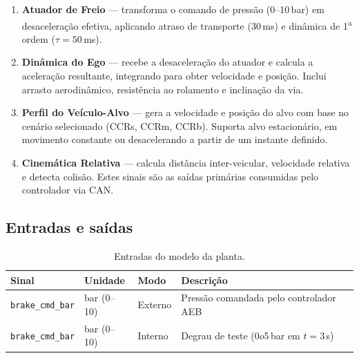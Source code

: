 \documentclass[12pt,a4paper]{article}
\newcommand{\param}[1]{\texttt{\color{laranjacode}#1}}
\begin{document}
\begin{enumerate}
  \item \textbf{Atuador de Freio} --- transforma o comando de pressão (0--10\,bar) em
        desaceleração efetiva, aplicando atraso de transporte (30\,ms) e dinâmica de
        1\textsuperscript{a} ordem ($\tau = 50$\,ms).

  \item \textbf{Dinâmica do Ego} --- recebe a desaceleração do atuador e calcula a
        aceleração resultante, integrando para obter velocidade e posição. Inclui
        arrasto aerodinâmico, resistência ao rolamento e inclinação da via.

  \item \textbf{Perfil do Veículo-Alvo} --- gera a velocidade e posição do alvo com base
        no cenário selecionado (CCRs, CCRm, CCRb). Suporta alvo estacionário, em
        movimento constante ou desacelerando a partir de um instante definido.

  \item \textbf{Cinemática Relativa} --- calcula distância inter-veicular, velocidade
        relativa e detecta colisão. Estes sinais são as saídas primárias consumidas
        pelo controlador via CAN.
\end{enumerate}

\subsection{Entradas e saídas}

\begin{table}[H]
  \centering
  \caption{Entradas do modelo da planta.}
  \begin{tabularx}{\linewidth}{lllX}
    \toprule
    \rowcolor{azulescuro!90}
    \color{white}\textbf{Sinal} &
    \color{white}\textbf{Unidade} &
    \color{white}\textbf{Modo} &
    \color{white}\textbf{Descrição} \\
    \midrule
    \param{brake\_cmd\_bar} & bar (0--10) & Externo & Pressão comandada pelo controlador AEB \\
    \rowcolor{azulclaro!50}
    \param{brake\_cmd\_bar} & bar (0--10) & Interno & Degrau de teste (0$	o$5\,bar em $t = 3$\,s) \\
    \bottomrule
  \end{tabularx}
\end{table}
\end{document}
